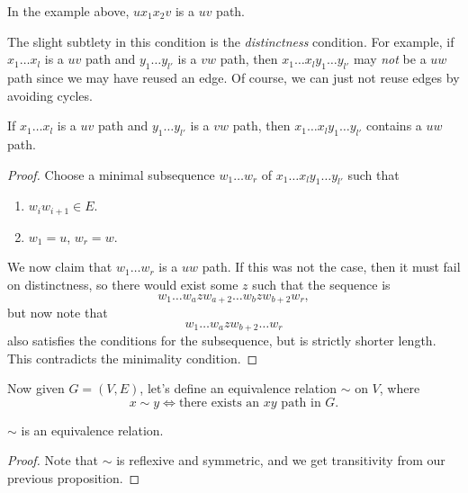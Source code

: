 \documentclass[a4paper]{scrartcl}
\begin{document}
In the example above, $u x_1 x_2 v$ is a $uv$ path. 

The slight subtlety in this condition is the \emph{distinctness} condition. For example, if $x_1 \dots x_l$ is a $uv$ path and $y_1 \dots y_{l'}$ is a $vw$ path, then $x_1 \dots x_l y_1 \dots y_{l'}$ may \emph{not} be a $uw$ path since we may have reused an edge. Of course, we can just not reuse edges by avoiding cycles.

\begin{proposition}
	If $x_1 \dots x_l$ is a $uv$ path and $y_1 \dots y_{l'}$ is a $vw$ path, then $x_1 \dots x_l y_1 \dots y_{l'}$ contains a $uw$ path.
\end{proposition}
\begin{proof}
	Choose a minimal subsequence $w_1 \dots w_r$ of $x_1 \dots x_l y_1 \dots y_{l'}$ such that
	\begin{enumerate}
		\item $w_i w_{i + 1} \in E$.
		\item $w_1 = u$, $w_r = w$.
	\end{enumerate}
	We now claim that $w_1 \dots w_r$ is a $uw$ path. If this was not the case, then it must fail on distinctness, so there would exist some $z$ such that the sequence is
	$$
	w_1 \dots w_{a} z w_{a + 2} \dots w_b z w_{b + 2} w_r,
	$$
	but now note that
	$$
	w_1 \dots w_{a}zw_{b+2} \dots w_r
	$$
	also satisfies the conditions for the subsequence, but is strictly shorter length. This contradicts the minimality condition.
\end{proof}

Now given $G = (V, E)$, let's define an equivalence relation $\sim$ on $V$, where
$$
x \sim y \iff \text{there exists an $xy$ path in $G$}.
$$

\begin{proposition}
	$\sim$ is an equivalence relation.
\end{proposition}
\begin{proof}
	Note that $\sim$ is reflexive and symmetric, and we get transitivity from our previous proposition.
\end{proof}
\end{document}

